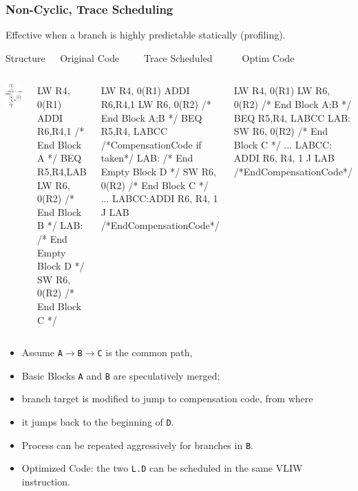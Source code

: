 \documentclass{beamer}
\renewcommand{\emph}[1]{\textcolor{structure}{#1}}
\newcommand{\emp}[1]{\textcolor{DikuRed}{ #1}}
\begin{document}
\begin{frame}[fragile,t]
    \frametitle{Non-Cyclic, Trace Scheduling}

Effective when a branch is highly predictable statically (profiling).

\begin{block}{Structure{\tt~~~}Original Code{\tt~~~~~}Trace Scheduled{\tt~~~~~~}Optim Code}\vspace{-1ex}
\begin{columns}
\includegraphics[width=13ex]{Figures/TraceSchedCFG}
\begin{colorcode}[fontsize=\tiny]
      LW   R4, 0(R1)
      ADDI R6,R4,1
/* End Block A */
      BEQ  R5,R4,LAB
      LW   R6, 0(R2)
/* End Block B */
LAB:
/* End Empty Block D */
      SW   R6, 0(R2) 
/* End Block C */
\end{colorcode}
\begin{colorcode}[fontsize=\tiny]
      LW   R4, 0(R1)
      ADDI R6,R4,1
      \emph{LW   R6, 0(R2)}
/* End Block A;B */
      BEQ  R5,R4,\emp{LABCC}
/*CompensationCode if taken*/
LAB:  
/* End Empty Block D */
      SW   R6, 0(R2) 
/* End Block C */
...
\emp{LABCC:}ADDI R6, R4, 1
      J    LAB
/*EndCompensationCode*/
\end{colorcode}
\begin{colorcode}[fontsize=\tiny]
      \emph{LW   R4, 0(R1)}
      \emph{LW   R6, 0(R2)}
/* End Block A;B */
      BEQ  R5,R4,\emp{LABCC}
LAB:  SW   R6, 0(R2) 
/* End Block C */
...
\emp{LABCC:}  ADDI R6, R4, 1
        J    LAB
/*EndCompensationCode*/
\end{colorcode}
\end{columns}
\end{block}

\bigskip\pause

\begin{scriptsize}
\begin{itemize}
    \item Assume {\tt A$\rightarrow$B$\rightarrow$C} is the common path,
    \item Basic Blocks {\tt A} and {\tt B} are speculatively merged; 
    \item branch target is modified to jump to compensation code, from where
    \item it jumps back to the beginning of {\tt D}.
    \item Process can be repeated aggressively for branches in {\tt B}.
    \item Optimized Code: the two \emph{{\tt L.D}} can be scheduled in the same VLIW instruction.
\end  {itemize}
\end{scriptsize}
\end{frame}
\end{document}
